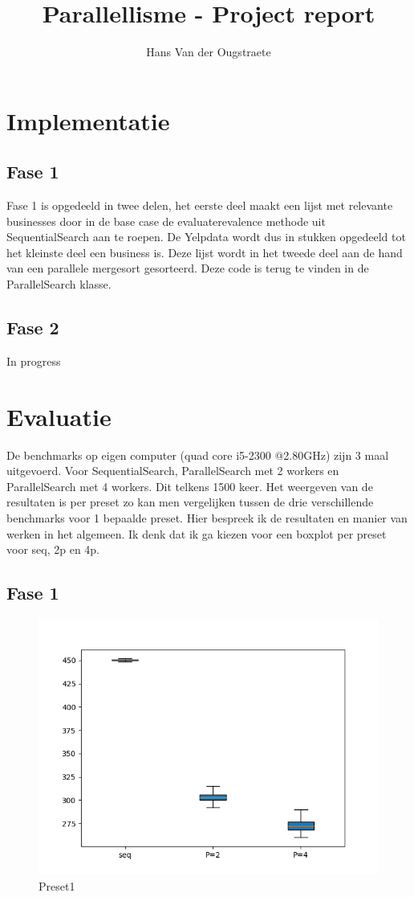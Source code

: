 \documentclass[]{article}
\title{Parallellisme - Project report}
\author{Hans Van der Ougstraete}
\begin{document}
\maketitle
\clearpage
\tableofcontents
\clearpage

\section{Implementatie}

\subsection{Fase 1}
Fase 1 is opgedeeld in twee delen, het eerste deel maakt een lijst met relevante businesses door in de base case de evaluaterevalence methode uit SequentialSearch aan te roepen. De Yelpdata wordt dus in stukken opgedeeld tot het kleinste deel een business is. Deze lijst wordt in het tweede deel aan de hand van een parallele mergesort gesorteerd. Deze code is terug te vinden in de ParallelSearch klasse.
\subsection{Fase 2}
In progress
\section{Evaluatie}
De benchmarks op eigen computer (quad core i5-2300 @2.80GHz) zijn 3 maal uitgevoerd. Voor SequentialSearch, ParallelSearch met 2 workers en ParallelSearch met 4 workers. Dit telkens 1500 keer. Het weergeven van de resultaten is per preset zo kan men vergelijken tussen de drie verschillende benchmarks voor 1 bepaalde preset.
Hier bespreek ik de resultaten en manier van werken in het algemeen. Ik denk dat ik ga kiezen voor een boxplot per preset voor seq, 2p en 4p. 
\subsection{Fase 1}

\begin{figure}[h]
	\centering
	\includegraphics[width=0.7\linewidth]{Preset_1}
	\caption[Preset1]{Preset1}
	\label{fig:preset1}
\end{figure}
\end{document}
